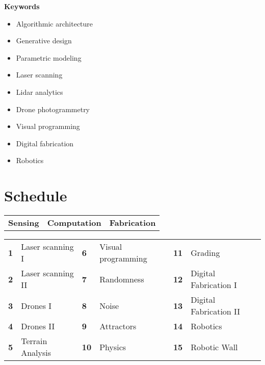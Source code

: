 \documentclass[11pt,article,oneside]{memoir}
\begin{document}
\noindent\textbf{Keywords}
\begin{multicols}{3}
\raggedright
\small
\begin{itemize}
\item Algorithmic architecture
\item Generative design
\item Parametric modeling
\item Laser scanning
\item Lidar analytics
\item Drone photogrammetry
\item Visual programming
\item Digital fabrication
\item Robotics
\end{itemize}
\end{multicols}

\section{Schedule}

\begin{table}[H]
\begin{tabular}{l @{\hskip 2.1cm} l @{\hskip 2cm} l}
\textbf{Sensing} & \textbf{Computation} & \textbf{Fabrication}\\
\end{tabular}
\end{table}
%
\vspace*{-1em}
%
\begin{table}[H]
\small
\begin{tabular}{l l l l l l}
\small
\textbf{1} & Laser scanning  I  & \textbf{6} & Visual programming & \textbf{11} & Grading\\
\textbf{2} & Laser scanning  II & \textbf{7} & Randomness & \textbf{12} & Digital Fabrication I\\
\textbf{3} & Drones I & \textbf{8} & Noise & \textbf{13} & Digital Fabrication II\\
\textbf{4} & Drones II  & \textbf{9} & Attractors & \textbf{14} & Robotics\\
\textbf{5} & Terrain Analysis & \textbf{10} & Physics & \textbf{15} & Robotic Wall\\

\end{tabular}
\end{table}

\clearpage
\end{document}
